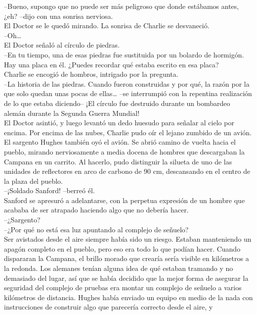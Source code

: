 --Bueno, supongo que no puede ser más peligroso que donde estábamos
antes, ¿eh? --dijo con una sonrisa nerviosa.\\
El Doctor se le quedó mirando. La sonrisa de Charlie se desvaneció.\\
--Oh\ldots{}\\
El Doctor señaló al círculo de piedras.\\
--En tu tiempo, una de esas piedras fue sustituida por un bolardo de
hormigón. Hay una placa en él. ¿Puedes recordar qué estaba escrito en
esa placa?\\
Charlie se encogió de hombros, intrigado por la pregunta.\\
--La historia de las piedras. Cuando fueron construidas y por qué, la
razón por la que solo quedan unas pocas de ellas\ldots{} --se
interrumpió con la repentina realización de lo que estaba diciendo-- ¡El
círculo fue destruido durante un bombardeo alemán durante la Segunda
Guerra Mundial!\\
El Doctor asintió, y luego levantó un dedo huesudo para señalar al cielo
por encima. Por encima de las nubes, Charlie pudo oír el lejano zumbido
de un avión.\\[2\baselineskip]El sargento Hughes también oyó el avión.
Se abrió camino de vuelta hacia el pueblo, mirando nerviosamente a media
docena de hombres que descargaban la Campana en un carrito. Al hacerlo,
pudo distinguir la silueta de uno de las unidades de reflectores en arco
de carbono de 90 cm, descansando en el centro de la plaza del pueblo.\\
--¡Soldado Sanford! --berreó él.\\
Sanford se apresuró a adelantarse, con la perpetua expresión de un
hombre que acababa de ser atrapado haciendo algo que no debería hacer.\\
--¿Sargento?\\
--¿Por qué no está esa luz apuntando al complejo de señuelo?\\
Ser avistados desde el aire siempre había sido un riesgo. Estaban
manteniendo un apagón completo en el pueblo, pero eso era todo lo que
podían hacer. Cuando dispararan la Campana, el brillo morado que crearía
sería visible en kilómetros a la redonda. Los alemanes tenían alguna
idea de qué estaban tramando y no demasiado del lugar, así que se había
decidido que la mejor forma de asegurar la seguridad del complejo de
pruebas era montar un complejo de señuelo a varios kilómetros de
distancia. Hughes había enviado un equipo en medio de la nada con
instrucciones de construir algo que parecería correcto desde el aire, y
